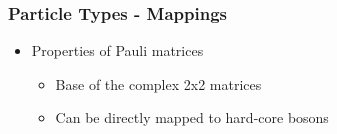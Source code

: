    \begin{frame}[t]
        \frametitle{Particle Types - Mappings}
        
        \vspace{-0.4cm}

        \begin{minipage}[t]{0.5\textwidth}
            \vspace{0pt}
            \begin{itemize}
                \item Properties of Pauli matrices \pause
                \begin{itemize}
                    \item Base of the complex 2x2 matrices \pause
                    \item Can be directly mapped to hard-core bosons
                \end{itemize}
            \end{itemize}
        \end{minipage}%
        \onslide
        \hfill
        \begin{minipage}[t]{0.45\textwidth}
            \vspace{0.0cm}
            \pause[3]
            \vspace{0.1cm}
        \end{minipage}

        \onslide %
    \end{frame}